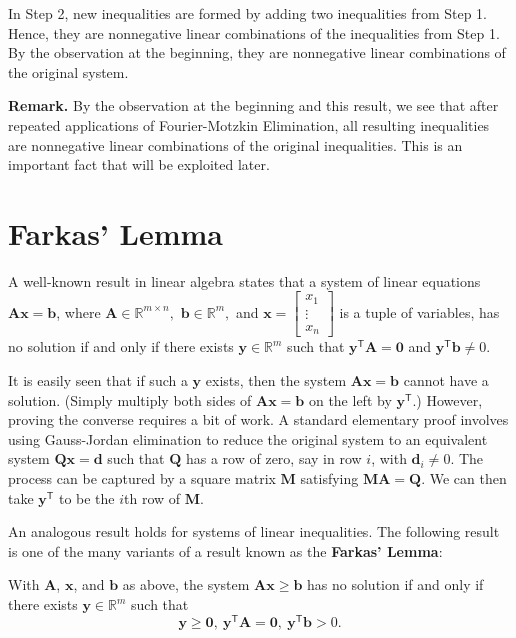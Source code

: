 \documentclass[]{book}
\def\gt{>}
\newcommand{\RR}{\mathbb{R}}
\newcommand{\T}{\mathsf{T}}
\newcommand{\mm}[1]{\mathbf{#1}}
\renewcommand{\vec}[1]{\mathbf{#1}}
\theoremstyle{definition}
\theoremstyle{definition}
\theoremstyle{remark}
\let\BeginKnitrBlock\begin \let\EndKnitrBlock\end
\begin{document}
\begin{enumerate}
  In Step 2, new inequalities are formed by adding two inequalities from
  Step 1. Hence, they are nonnegative linear combinations of the
  inequalities from Step 1. By the observation at the beginning, they
  are nonnegative linear combinations of the original system.

  \textbf{Remark.} By the observation at the beginning and this result,
  we see that after repeated applications of Fourier-Motzkin
  Elimination, all resulting inequalities are nonnegative linear
  combinations of the original inequalities. This is an important fact
  that will be exploited later.
\end{enumerate}

\chapter{Farkas' Lemma}\label{farkas-lemma}

A well-known result in linear algebra states that a system of linear
equations \(\mm{A}\vec{x} = \vec{b}\), where
\(\mm{A} \in \RR^{m\times n},\) \(\vec{b}\in \RR^m,\) and
\(\vec{x} = \begin{bmatrix} x_1\\ \vdots \\ x_n\end{bmatrix}\) is a
tuple of variables, has no solution if and only if there exists
\(\vec{y} \in \RR^m\) such that \(\vec{y}^\T\mm{A} = \vec{0}\) and
\(\vec{y}^\T \vec{b} \neq 0\).

It is easily seen that if such a \(\vec{y}\) exists, then the system
\(\mm{A}\vec{x} = \vec{b}\) cannot have a solution. (Simply multiply
both sides of \(\mm{A}\vec{x} = \vec{b}\) on the left by
\(\vec{y}^\T\).) However, proving the converse requires a bit of work. A
standard elementary proof involves using Gauss-Jordan elimination to
reduce the original system to an equivalent system
\(\mm{Q}\vec{x} = \vec{d}\) such that \(\mm{Q}\) has a row of zero, say
in row \(i\), with \(\vec{d}_i \neq 0\). The process can be captured by
a square matrix \(\mm{M}\) satisfying \(\mm{M}\mm{A} = \mm{Q}\). We can
then take \(\vec{y}^\T\) to be the \(i\)th row of \(\mm{M}\).

An analogous result holds for systems of linear inequalities. The
following result is one of the many variants of a result known as the
\textbf{Farkas' Lemma}:

\BeginKnitrBlock{theorem}
\protect\hypertarget{thm:farkas}{}{\label{thm:farkas}}With \(\mm{A}\),
\(\vec{x}\), and \(\vec{b}\) as above, the system
\(\mm{A}\vec{x} \geq \vec{b}\) has no solution if and only if there
exists \(\vec{y} \in \RR^m\) such that
\[\vec{y} \geq \vec{0},~\vec{y}^\T \mm{A} = \vec{0},~
\vec{y}^\T\vec{b} \gt 0.\]
\EndKnitrBlock{theorem}
\end{document}
